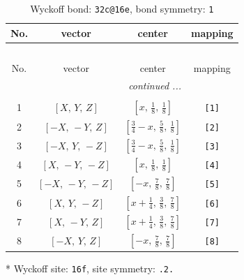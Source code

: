 \documentclass[fleqn,8pt]{jsarticle}
\begin{document}
\renewcommand{\arraystretch}{1.2}
\begin{longtable}{cccc}
\caption{Wyckoff bond: {\tt 32c@16e}, bond symmetry: {\tt 1}}
 \\
 \hline \hline
No. & vector & center & mapping \\ \hline \endfirsthead

\multicolumn{3}{l}{\tablename\ \thetable{}} \\
 \hline \hline
No. & vector & center & mapping \\ \hline \endhead

 \hline \hline
\multicolumn{3}{r}{\footnotesize\it continued ...} \\ \endfoot

 \hline \hline
\multicolumn{3}{r}{} \\ \endlastfoot

1 & $\left[ X,\, Y,\, Z \right]$ & $\left[ x,\, \frac{1}{8},\, \frac{1}{8} \right]$ & {\tt [1]} \\ \hline
2 & $\left[ - X,\, - Y,\, Z \right]$ & $\left[ \frac{3}{4} - x,\, \frac{5}{8},\, \frac{1}{8} \right]$ & {\tt [2]} \\ \hline
3 & $\left[ - X,\, Y,\, - Z \right]$ & $\left[ \frac{3}{4} - x,\, \frac{5}{8},\, \frac{1}{8} \right]$ & {\tt [3]} \\ \hline
4 & $\left[ X,\, - Y,\, - Z \right]$ & $\left[ x,\, \frac{1}{8},\, \frac{1}{8} \right]$ & {\tt [4]} \\ \hline
5 & $\left[ - X,\, - Y,\, - Z \right]$ & $\left[ - x,\, \frac{7}{8},\, \frac{7}{8} \right]$ & {\tt [5]} \\ \hline
6 & $\left[ X,\, Y,\, - Z \right]$ & $\left[ x + \frac{1}{4},\, \frac{3}{8},\, \frac{7}{8} \right]$ & {\tt [6]} \\ \hline
7 & $\left[ X,\, - Y,\, Z \right]$ & $\left[ x + \frac{1}{4},\, \frac{3}{8},\, \frac{7}{8} \right]$ & {\tt [7]} \\ \hline
8 & $\left[ - X,\, Y,\, Z \right]$ & $\left[ - x,\, \frac{7}{8},\, \frac{7}{8} \right]$ & {\tt [8]} \\
\end{longtable}
* Wyckoff site: {\tt 16f}, site symmetry: {\tt .2.}
\renewcommand{\arraystretch}{1.2}
\end{document}
